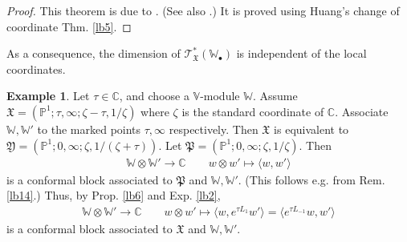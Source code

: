 \documentclass[11pt,b5paper,notitlepage]{article}
\theoremstyle{definition}
\newtheorem{eg}[df]{Example}
\theoremstyle{plain}
\newcommand{\fk}{\mathfrak}
\newcommand{\bk}[1]{\langle {#1}\rangle}
\newcommand{\scr}{\mathscr}
\newcommand{\blt}{\bullet}
\newcommand{\Vbb}{\mathbb V}
\newcommand{\Wbb}{\mathbb W}
\newcommand{\Cbb}{\mathbb C}
\newcommand{\Pbb}{\mathbb P}
\numberwithin{equation}{section}
\begin{document}
\begin{proof}
This theorem is due to \cite[Thm. 6.5.4]{FB04}. (See also \cite[Thm. 3.2]{Gui23a}.) It is proved using Huang's change of coordinate Thm. \ref{lb5}.
\end{proof}

As a consequence, the dimension of $\scr T_{\fk X}^*(\Wbb_\blt)$ is independent of the local coordinates.


\begin{eg}\label{lb24}
Let $\tau\in\Cbb$, and choose a $\Vbb$-module $\Wbb$. Assume $\fk X=(\Pbb^1;\tau,\infty;\zeta-\tau,1/\zeta)$ where $\zeta$ is the standard coordinate of $\Cbb$. Associate $\Wbb,\Wbb'$ to the marked points $\tau,\infty$ respectively.  Then $\fk X$ is equivalent to $\fk Y=(\Pbb^1;0,\infty;\zeta,1/(\zeta+\tau))$. Let $\fk P=(\Pbb^1;0,\infty;\zeta,1/\zeta)$. Then
\begin{align*}
\Wbb\otimes\Wbb'\rightarrow\Cbb\qquad w\otimes w'\mapsto\bk{w,w'}
\end{align*}
is a conformal block associated to $\fk P$ and $\Wbb,\Wbb'$. (This follows e.g. from Rem. \ref{lb14}.) Thus, by Prop. \ref{lb6} and Exp. \ref{lb2}, 
\begin{gather*}
\Wbb\otimes\Wbb'\rightarrow\Cbb\qquad w\otimes w'\mapsto\bk{w,e^{\tau L_1}w'}=\bk{e^{\tau L_{-1}}w,w'}
\end{gather*}
is a conformal block associated to $\fk X$ and $\Wbb,\Wbb'$.
\end{eg}
\end{document}
